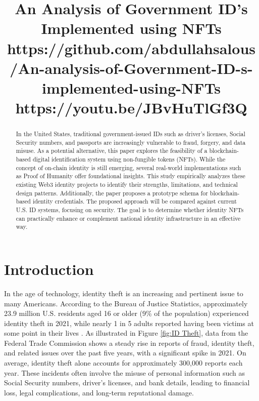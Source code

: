 \documentclass[conference]{IEEEtran}
\begin{document}
\title {An Analysis of Government ID’s Implemented using NFTs \\[1ex] \large https://github.com/abdullahsalous/An-analysis-of-Government-ID-s-implemented-using-NFTs \\[1ex] \large https://youtu.be/JBvHuTlGf3Q}

\author{
}

\maketitle

\begin{abstract}
In the United States, traditional government-issued IDs such as driver's licenses, Social Security numbers, and passports are increasingly vulnerable to fraud, forgery, and data misuse. As a potential alternative, this paper explores the feasibility of a blockchain-based digital identification system using non-fungible tokens (NFTs). While the concept of on-chain identity is still emerging, several real-world implementations such as Proof of Humanity offer foundational insights. This study empirically analyzes these existing Web3 identity projects to identify their strengths, limitations, and technical design patterns. Additionally, the paper proposes a prototype schema for blockchain-based identity credentials. The proposed approach will be compared against current U.S. ID systems, focusing on security. The goal is to determine whether identity NFTs can practically enhance or complement national identity infrastructure in an effective way.
\end{abstract}

\section{Introduction}
In the age of technology, identity theft is an increasing and pertinent issue to many Americans. According to the Bureau of Justice Statistics, approximately 23.9 million U.S. residents aged 16 or older (9\% of the population) experienced identity theft in 2021, while nearly 1 in 5 adults reported having been victims at some point in their lives \cite{Bureau of Justice Statistics}. As illustrated in Figure \ref{fig:ID Theft}, data from the Federal Trade Commission shows a steady rise in reports of fraud, identity theft, and related issues over the past five years, with a significant spike in 2021. On average, identity theft alone accounts for approximately 300,000 reports each year. These incidents often involve the misuse of personal information such as Social Security numbers, driver's licenses, and bank details, leading to financial loss, legal complications, and long-term reputational damage. 
\end{document}
